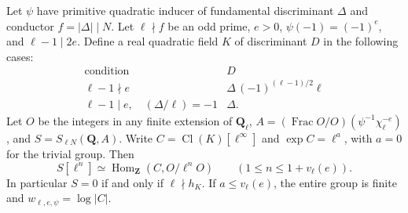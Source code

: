\begin{proposition}
\label{famsel:quadraticlayers}
Let \(\psi\) have primitive quadratic inducer of fundamental discriminant
\(\Delta\) and conductor \(f=|\Delta|\mid N\). Let \(\ell\nmid f\) be an
odd prime, \(e>0\), \(\psi(-1)=(-1)^e\), and \(\ell-1\mid2e\).
Define a real quadratic field \(K\) of discriminant \(D\) in the following cases:
\[
\begin{array}{c|c}
  \text{condition} & D\\ \hline
  \ell-1\nmid e & \Delta\,(-1)^{(\ell-1)/2}\ell\\
  \ell-1\mid e,\quad (\Delta/\ell)=-1 & \Delta .
\end{array}
\]
Let \(O\) be the integers in any finite extension of \(\mathbf Q_\ell\),
\(A=(\operatorname{Frac}O/O)(\psi^{-1}\chi_\ell^{-e})\), and
\(S=S_{\ell N}(\mathbf Q,A)\). Write \(C=\operatorname{Cl}(K)[\ell^\infty]\)
and \(\exp C=\ell^a\), with \(a=0\) for the trivial group. Then
\[
 S[\ell^n]\simeq\operatorname{Hom}_{\mathbf Z}(C,O/\ell^nO)
 \qquad(1\le n\le1+v_\ell(e)).
\]
In particular \(S=0\) if and only if \(\ell\nmid h_K\). If \(a\le v_\ell(e)\),
the entire group is finite and \(w_{\ell,e,\psi}=\log|C|\).
\end{proposition}
